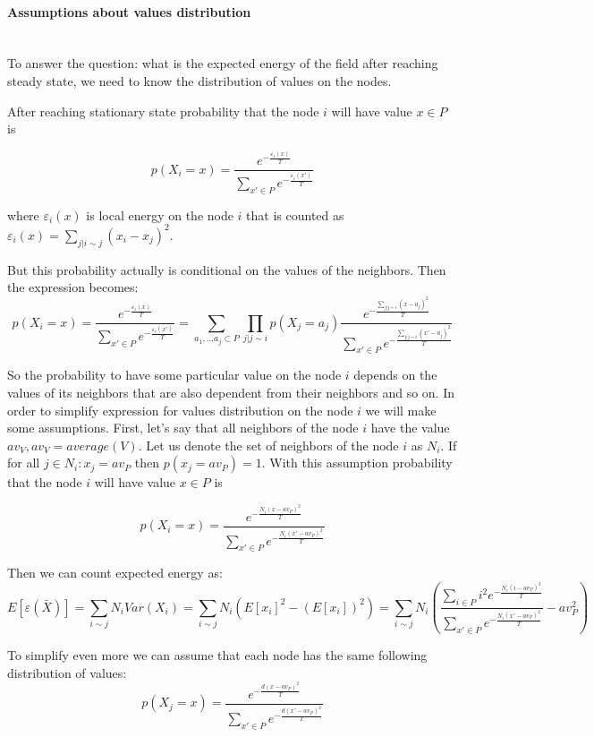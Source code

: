 \documentclass[12pt]{report}
\begin{document}
\paragraph{Assumptions about values distribution}
\mbox{} \\


To answer the question: what is the expected energy of the field after reaching steady state, we need to know the distribution of values on the nodes.


After reaching stationary state probability that the node $i$ will have value $x \in P$ is

$$ p(X_i = x) = \frac{ e^{-\frac{\varepsilon_i(x)}{T}} }{ \sum\limits_{x'\in P} e^{-\frac{\varepsilon_i(x')}{T}}} $$

where $\varepsilon_i(x)$ is local energy on the node $i$ that is counted as $\varepsilon_i(x) = \sum\limits_{j | i \sim j} (x_i - x_j)^2 $. 
  
But this probability actually is conditional on the values of the neighbors. Then the expression becomes:
$$ p(X_i = x) = \frac{ e^{-\frac{\varepsilon_i(x)}{T}} }{ \sum\limits_{x'\in P} e^{-\frac{\varepsilon_i(x')}{T}}}  = 
\sum\limits_{a_1, ... a_j \subset P} \prod\limits_{j|j \sim i} p(X_j  = a_j)
\frac{ e^{-\frac{ \sum\limits_{j|j \sim i}(x - a_j)^2 }{T}} }{ \sum\limits_{x'\in P} e^{-\frac{ \sum\limits_{j|j \sim i}(x' - a_j)^2 }{T}}}  $$

So the probability to have some particular value on the node $i$ depends on the values of its neighbors that are also dependent from their neighbors and so on.
In order to simplify expression for values distribution on the node $i$ we will make some assumptions. First, let's say that all neighbors of the node $i$ have the value $av_V, av_V = average(V)$. Let us denote the set of neighbors of the node $i$ as $N_i$. If for all $j \in N_i : x_j = av_P$ then 
$p(x_j  = av_P) = 1$. With this assumption probability that the node $i$ will have value $x \in P$ is


$$ p(X_i = x) = 
\frac{ e^{-\frac{N_i(x - av_P)^2}{T}} }{ \sum\limits_{x'\in P} e^{-\frac{N_i(x' - av_P)^2}{T}}}$$

Then we can count expected energy as:
$$ E[\varepsilon (\bar{X})] =  \sum_{i \sim j} N_iVar(X_i) =
\sum_{i \sim j} N_i  \left(E[x_i]^2 - (E[x_i])^2\right) =
\sum_{i \sim j} N_i \left(\frac{ \sum\limits_{i\in P} i^2 e^{- \frac{N_i(i - av_P)^2}{T}} }{ \sum\limits_{x'\in P} e^{-\frac{N_i(x' - av_P)^2}{T}}} - av_P^2\right)
$$

To simplify even more we can assume that each node has the same following distribution of values:
$$ p(X_j = x) = 
\frac{ e^{-\frac{d(x - av_P)^2}{T}} }{ \sum\limits_{x'\in P} e^{-\frac{d(x' - av_P)^2}{T}}}$$
\end{document}
